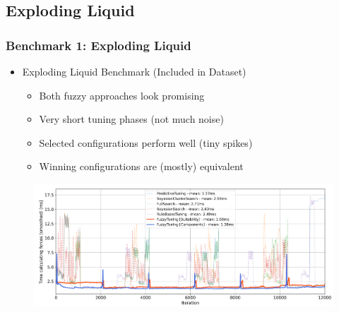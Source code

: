 \documentclass[
	10pt,
	t		%
]{beamer}
\begin{document}
\subsection{Exploding Liquid}
\begin{frame}
	\frametitle{Benchmark 1: Exploding Liquid}
	\begin{itemize}
		\item Exploding Liquid Benchmark (Included in Dataset)
		      \begin{itemize}
			      \item Both fuzzy approaches look promising
			      \item Very short tuning phases (not much noise)
			      \item Selected configurations perform well (tiny spikes)
			      \item Winning configurations are (mostly) equivalent
		      \end{itemize}
	\end{itemize}

	\begin{figure}
		\centering
		\includegraphics[width=1\textwidth]{figures/exploding-liquid-timings.png}
	\end{figure}
\end{frame}
\end{document}
